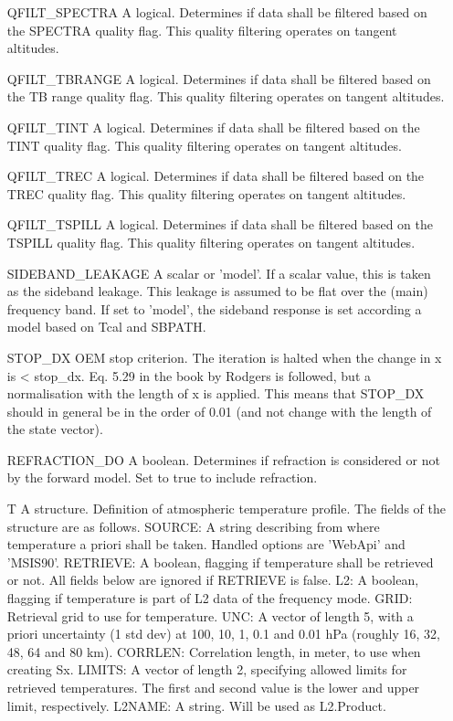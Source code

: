 \begin{changemargin}{2.5cm}{0.0cm}
\begin{itemize}
\item[{QFILT\_SPECTRA}] 
A logical. Determines if data shall be filtered based on the SPECTRA quality
flag. This quality filtering operates on tangent altitudes.

\item[{QFILT\_TBRANGE}] 
A logical. Determines if data shall be filtered based on the TB range quality
flag. This quality filtering operates on tangent altitudes.

\item[{QFILT\_TINT}] 
A logical. Determines if data shall be filtered based on the TINT quality
flag. This quality filtering operates on tangent altitudes.

\item[{QFILT\_TREC}] 
A logical. Determines if data shall be filtered based on the TREC quality
flag. This quality filtering operates on tangent altitudes.

\item[{QFILT\_TSPILL}] 
A logical. Determines if data shall be filtered based on the TSPILL quality
flag. This quality filtering operates on tangent altitudes.

\item[{SIDEBAND\_LEAKAGE}] 
A scalar or 'model'. If a scalar value, this is taken as the sideband
leakage. This leakage is assumed to be flat over the (main) frequency band.
If set to 'model', the sideband response is set according a model based on
Tcal and SBPATH.

\item[{STOP\_DX}] 
OEM stop criterion. The iteration is halted when the change in x
is < stop\_dx. Eq. 5.29 in the book by Rodgers is followed, but a
normalisation with the length of x is applied. This means that STOP\_DX
should in general be in the order of 0.01 (and not change with the
length of the state vector).

\item[{REFRACTION\_DO}] 
A boolean. Determines if refraction is considered or not by the forward
model. Set to true to include refraction.

\item[{T}] 
A structure. Definition of atmospheric temperature profile. The fields of
the structure are as follows. SOURCE: A string describing from where
temperature a priori shall be taken. Handled options are 'WebApi' and
'MSIS90'. RETRIEVE: A boolean, flagging if temperature shall be retrieved or
not. All fields below are ignored if RETRIEVE is false. L2: A boolean,
flagging if temperature is part of L2 data of the frequency mode. GRID:
Retrieval grid to use for temperature. UNC: A vector of length 5, with a
priori uncertainty (1 std dev)  at 100, 10, 1, 0.1 and 0.01 hPa (roughly
16, 32, 48, 64 and 80 km). CORRLEN: Correlation length, in meter, to use
when creating Sx. LIMITS: A vector of length 2, specifying allowed limits
for retrieved temperatures. The first and second value is the lower and
upper limit, respectively. L2NAME: A string. Will be used as L2.Product.


\end{itemize}
\end{changemargin}
